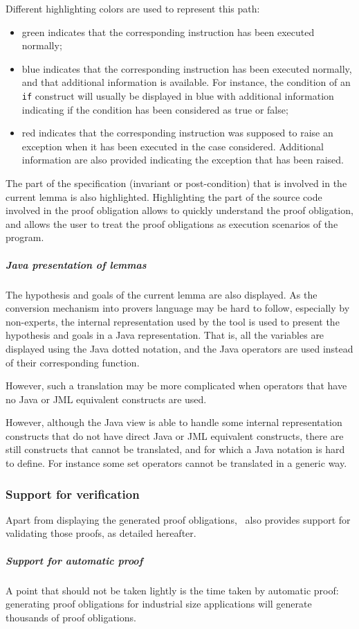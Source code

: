 Different highlighting colors are used to represent this path:
\begin{itemize}
\item green indicates that the corresponding instruction has been
   executed normally;
\item blue indicates that the corresponding instruction has been
   executed normally, and that additional information is
   available. For instance, the condition of an \texttt{if} construct will
   usually be displayed in blue with additional information indicating
   if the condition has been considered as true or false;
\item red indicates that the corresponding instruction was supposed to
   raise an exception when it has been executed in the case
   considered.  Additional information are also provided indicating
   the exception that has been raised.
\end{itemize}
The part of the specification (invariant or post-condition) that is
involved in the current lemma is also highlighted.  Highlighting the
part of the source code involved in the proof obligation allows to
quickly understand the proof obligation, and allows the user to treat
the proof obligations as execution scenarios of the program.
\subparagraph{Java presentation of lemmas}
The hypothesis and goals of the current lemma are also displayed. As
the conversion mechanism into provers language may be hard to follow, especially by
non-experts, the internal representation used by the tool is used to
present the hypothesis and goals in a Java representation. That is,
all the variables are displayed using the Java dotted notation, and
the Java operators are used instead of their corresponding function.

However, such a translation may be more complicated when operators that
have no Java or JML equivalent constructs are used.  


 However, although the Java view is able to handle some internal
 representation constructs that do not have direct Java or JML
 equivalent constructs, there are still constructs that cannot be
 translated, and for which a Java notation is hard to define. For
 instance some set operators cannot be translated in a generic way.

\subsubsection{Support for verification}
Apart from displaying the generated proof obligations, \JACK\ also
provides support for validating those proofs, as detailed hereafter.
\subparagraph{Support for automatic proof}
\label{Support for automatic proof}
 A point that should not be taken lightly is the time taken by
automatic proof: generating proof obligations for industrial size
applications will generate thousands of proof obligations.

